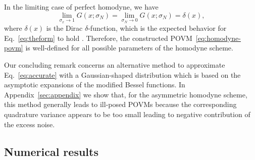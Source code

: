 \documentclass[%
reprint,
superscriptaddress,
 amsmath,amssymb,amsfonts,
 aps,
 pra,
 longbibliography
]{revtex4-2}
\begin{document}
In the limiting case of perfect homodyne,
we have
\begin{equation}
    \lim_{\sigma_x \to 1}G(x;\sigma_N)=\lim_{\sigma_N \to 0}G(x;\sigma_N)=\delta(x),
\end{equation}
where $\delta(x)$ is the Dirac $\delta$-function,
which is the expected behavior for
Eq.~\eqref{eq:theform} to hold .
Therefore, the constructed POVM~\eqref{eq:homodyne-povm}
is well-defined for all possible parameters of the homodyne scheme.

  

Our concluding remark concerns an alternative method
to approximate Eq.~\eqref{eq:accurate}
with a Gaussian-shaped distribution
which is based on the asymptotic expansions of the modified Bessel functions.
In Appendix~\ref{sec:appendix} we show that, for the asymmetric homodyne scheme,
this method generally leads to ill-posed POVMs because
the corresponding quadrature variance
appears to be too small leading to negative
contribution of the excess noise. 


\subsection{Numerical results}
\label{subsec:num-hom}
\end{document}
